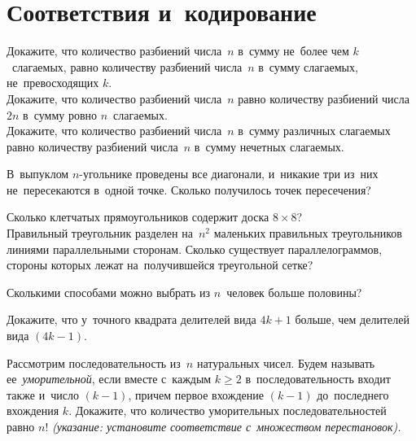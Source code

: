 
\section*{Соответствия и~кодирование}


\begin{problems}

\item 
\subproblem
Докажите, что количество разбиений числа~$n$ в~сумму не~более чем
$k$~слагаемых, равно количеству разбиений числа~$n$ в~сумму слагаемых,
не~превосходящих $k$.
\\
\subproblem
Докажите, что количество разбиений числа~$n$ равно количеству разбиений
числа~$2n$ в~сумму ровно $n$~слагаемых.
\\
\subproblem
Докажите, что количество разбиений числа~$n$ в~сумму различных слагаемых равно
количеству разбиений числа~$n$ в~сумму нечетных слагаемых.

\item
В~выпуклом $n$-угольнике проведены все диагонали, и~никакие три из~них
не~пересекаются в~одной точке.
Сколько получилось точек пересечения?

\item
\subproblem
Сколько клетчатых прямоугольников содержит доска $8 \times 8$?
\\
\subproblem
Правильный треугольник разделен на~$n^2$ маленьких правильных треугольников
линиями параллельными сторонам.
Сколько существует параллелограммов, стороны которых лежат на~получившейся
треугольной сетке?

\item
Сколькими способами можно выбрать из $n$~человек больше половины?

\item
Докажите, что у~точного квадрата делителей вида $4 k + 1$ больше, чем делителей
вида $(4 k - 1)$.

\item
Рассмотрим  последовательность из~$n$ натуральных чисел.
Будем называть ее~\emph{уморительной}, если вместе с~каждым $k \geq 2$
в~последовательность входит также и~число $(k - 1)$, причем первое вхождение
$(k - 1)$ до~последнего вхождения $k$.
Докажите, что количество уморительных последовательностей равно $n!$
\emph{(указание: установите соответствие с~множеством перестановок).}

\end{problems}

